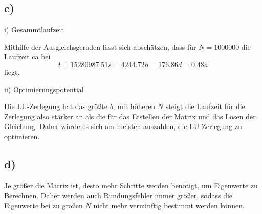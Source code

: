   \subsection*{c)}

    \noindent i) Gesammtlaufzeit

    \noindent Mithilfe der Ausgleichsgeraden lässt sich abschätzen, dass für $N=1000000$
    die Laufzeit ca bei
    $$t= 15280987.51 s =  4244.72 h = 176.86 d= 0.48 a$$
    liegt.

    \noindent ii) Optimierungspotential

    \noindent Die LU-Zerlegung hat das größte $b$, mit höheren $N$ steigt die Laufzeit für die Zerlegung
    also stärker an als die für das Erstellen der Matrix und das Lösen der Gleichung. Daher
    würde es sich am meisten auszahlen, die LU-Zerlegung zu optimieren.


  \subsection*{d)}

    \noindent Je größer die Matrix ist, desto mehr Schritte werden benötigt, um Eigenwerte zu Berechnen. Daher
    werden auch Rundungsfehler immer größer, sodass die Eigenwerte bei zu großen $N$ nicht mehr vernünftig bestimmt
    werden können.

